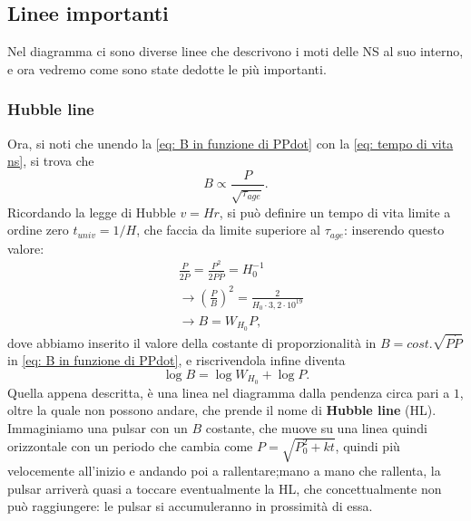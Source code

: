 \subsection{Linee importanti}
Nel diagramma ci sono diverse linee che descrivono i moti delle NS al suo interno, e ora vedremo come sono state dedotte le più importanti.
\subsubsection{Hubble line}
Ora, si noti che unendo la \eqref{eq: B in funzione di PPdot} con la \eqref{eq: tempo di vita ns}, si trova che 
\begin{equation}
    B\propto \frac{P}{\sqrt{\tau_{age}}}. 
\end{equation}
Ricordando la legge di Hubble $v=Hr$, si può definire un tempo di vita limite a ordine zero $t_{univ}=1/H$, che faccia da limite superiore al $\tau_{age}$: inserendo questo valore:
\begin{align}
    &\frac{P}{2\dot{P}}=\frac{P^2}{2P\dot{P}}=H_0^{-1}\\
    &\xrightarrow{} \left(\frac{P}{B}\right)^2=\frac{2}{H_0\cdot3,2\cdot10^{19}}\\
    &\xrightarrow{}B=W_{H_0}P,
\end{align}
dove abbiamo inserito il valore della costante di proporzionalità in $B=cost.\sqrt{P\dot{P}}$ in \eqref{eq: B in funzione di PPdot}, e riscrivendola infine diventa
\begin{equation}
    \log B = \log W_{H_0}+\log P.
    \label{eq: equazione hubble line}
\end{equation}
Quella appena descritta, è una linea nel diagramma dalla pendenza circa pari a $1$, oltre la quale non possono andare, che prende il nome di \textbf{Hubble line} (HL).
Immaginiamo una pulsar con un $B$ costante, che muove su una linea quindi orizzontale con un periodo che cambia come $P=\sqrt{P_0^2 + kt} $, quindi più velocemente all'inizio e andando poi a rallentare;mano a mano che rallenta, la pulsar arriverà quasi a toccare eventualmente la HL, che concettualmente non può raggiungere: le pulsar si accumuleranno in prossimità di essa.

